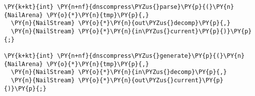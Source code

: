\begin{Verbatim}[commandchars=\\\{\},codes={\catcode`\$=3\catcode`\^=7\catcode`\_=8}]
\PY{k+kt}{int} \PY{n+nf}{dnscompress\PYZus{}parse}\PY{p}{(}\PY{n}{NailArena} \PY{o}{*}\PY{n}{tmp}\PY{p}{,}
  \PY{n}{NailStream} \PY{o}{*}\PY{n}{out\PYZus{}decomp}\PY{p}{,}
  \PY{n}{NailStream} \PY{o}{*}\PY{n}{in\PYZus{}current}\PY{p}{)}\PY{p}{;}

\PY{k+kt}{int} \PY{n+nf}{dnscompress\PYZus{}generate}\PY{p}{(}\PY{n}{NailArena} \PY{o}{*}\PY{n}{tmp}\PY{p}{,}
  \PY{n}{NailStream} \PY{o}{*}\PY{n}{in\PYZus{}decomp}\PY{p}{,}
  \PY{n}{NailStream} \PY{o}{*}\PY{n}{out\PYZus{}current}\PY{p}{)}\PY{p}{;}
\end{Verbatim}
